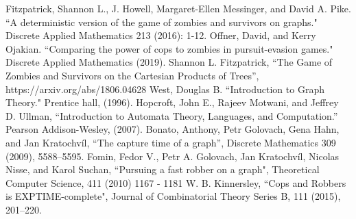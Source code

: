 \documentclass[1p]{elsarticle}
\begin{document}
	
\begin{thebibliography}{999}
	
	Fitzpatrick, Shannon L., J. Howell, Margaret-Ellen Messinger, and David A. Pike. ``A deterministic version of the
	game of zombies and survivors on graphs." Discrete Applied Mathematics 213 (2016): 1-12.
	Offner, David, and Kerry Ojakian. ``Comparing the power of cops to zombies in pursuit-evasion games." Discrete
	Applied Mathematics (2019).
	Shannon L. Fitzpatrick, ``The Game of Zombies and Survivors on the Cartesian Products of Trees'', https://arxiv.org/abs/1806.04628
	West, Douglas B. ``Introduction to Graph Theory." Prentice hall, (1996).
	Hopcroft, John E., Rajeev Motwani, and Jeffrey D. Ullman, ``Introduction to Automata Theory, Languages, and
	Computation.'' Pearson Addison-Wesley, (2007).
	Bonato, Anthony, Petr Golovach, Gena Hahn, and Jan Kratochvíl, ``The capture time of a graph'', Discrete Mathematics
	309 (2009), 5588–5595.
	Fomin, Fedor V., Petr A. Golovach, Jan Kratochvíl, Nicolas Nisse, and Karol Suchan, ``Pursuing a fast robber on a
	graph", Theoretical Computer Science, 411 (2010) 1167 - 1181
	W. B. Kinnersley, ``Cops and Robbers is EXPTIME-complete", Journal of Combinatorial Theory Series B, 111 (2015), 201–220.
\end{thebibliography}
	
\end{document}

